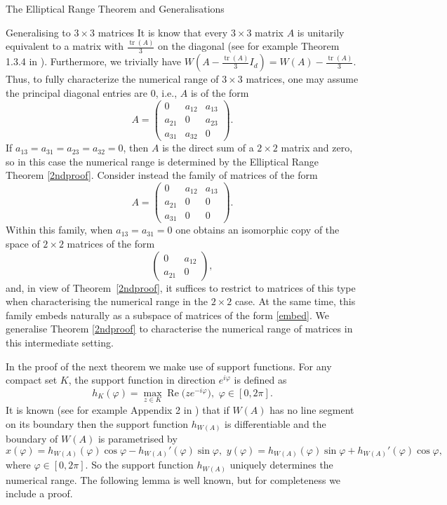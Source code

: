 \documentclass[12pt]{article}
\theoremstyle{plain}
\theoremstyle{definition}
\theoremstyle{remark}
\renewcommand{\phi}{\varphi}
\renewcommand{\Re}[1]{\operatorname{Re} #1 }
\numberwithin{equation}{section}
\begin{document}
\begin{section}{The Elliptical Range Theorem and Generalisations}
\begin{subsection}{Generalising to $3 \times 3$ matrices}
It is know that every $3 \times 3$ matrix $A$ is unitarily equivalent to a matrix with $\frac{\operatorname{tr}(A)}{3}$ on the diagonal (see for example Theorem 1.3.4 in \cite{hornjohnson}). Furthermore, we trivially have $W(A  - \frac{\operatorname{tr}(A)}{3}I_d) = W(A) - \frac{\operatorname{tr}(A)}{3}$. Thus, to fully characterize the numerical range of $3 \times 3$ matrices, one may assume the principal diagonal entries are $0$, i.e., $A$ is of the form
\begin{equation}\label{embed}
A =  \begin{pmatrix}
        0 & a_{12} & a_{13} \\
        a_{21} & 0 & a_{23} \\
        a_{31} & a_{32} & 0
    \end{pmatrix}.
\end{equation}
If $a_{13} = a_{31} = a_{23} = a_{32} = 0$, then $A$ is the direct sum of a $2 \times 2$ matrix and zero, so in this case the numerical range is determined by the Elliptical Range Theorem \ref{2ndproof}. Consider instead the family of matrices of the form
\[
A = \begin{pmatrix}
        0 & a_{12} & a_{13} \\
        a_{21} & 0 & 0 \\
        a_{31} & 0 & 0
    \end{pmatrix}.
\]
Within this family, when $a_{13} = a_{31} = 0$ one obtains an isomorphic copy of the space of \(2 \times 2\) matrices of the form  
\[
\begin{pmatrix}
0 & a_{12} \\
a_{21} & 0
\end{pmatrix},
\]
and, in view of Theorem~\ref{2ndproof}, it suffices to restrict to matrices of this type when characterising the numerical range in the \(2 \times 2\) case. At the same time, this family embeds naturally as a subspace of matrices of the form \eqref{embed}. We generalise Theorem \ref{2ndproof} to characterise the numerical range of matrices in this intermediate setting.
    




In the proof of the next theorem we make use of support functions. For any compact set $K$, the support function in direction $e^{i \phi}$ is defined as
\[
h_K(\phi) = \max_{z \in K} \Re\big( z e^{-i\phi} \big), \, \, \phi \in [0, 2 \pi].
\]
It is known (see for example Appendix 2 in \cite{gau2021numerical}) that if $W(A)$ has no line segment on its boundary then the support function $h_{W(A)}$ is differentiable and the boundary of $W(A)$ is parametrised by
\begin{equation}\label{naturalpara}
    x(\phi) = h_{W(A)}(\phi) \cos\phi - h_{W(A)}'(\phi) \sin\phi, \, \, 
y(\phi) = h_{W(A)}(\phi) \sin\phi + h_{W(A)}'(\phi) \cos\phi,
\end{equation}
where $\phi \in [0, 2 \pi].$ So the support function $h_{W(A)}$ uniquely determines the numerical range. The following lemma is well known, but for completeness we include a proof.



\end{subsection}
\end{section}
\end{document}
